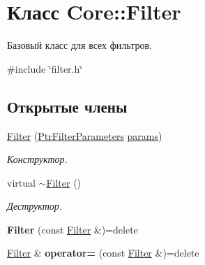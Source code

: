 \hypertarget{class_core_1_1_filter}{}\section{Класс Core\+:\+:Filter}
\label{class_core_1_1_filter}


Базовый класс для всех фильтров.  




{\ttfamily \#include \char`\"{}filter.\+h\char`\"{}}

\subsection*{Открытые члены}
\begin{DoxyCompactItemize}
\item 
\hyperlink{class_core_1_1_filter_af1ac0dfc8813579e0173b315c5a3fcad}{Filter} (\hyperlink{namespace_core_a4811af8148ba137d644b9a61a042cf03}{Ptr\+Filter\+Parameters} \hyperlink{class_core_1_1_filter_a44aa749b49ba46256975ce545531ecf7}{params})\hypertarget{class_core_1_1_filter_af1ac0dfc8813579e0173b315c5a3fcad}{}\label{class_core_1_1_filter_af1ac0dfc8813579e0173b315c5a3fcad}

\begin{DoxyCompactList}\small\item\em Конструктор. \end{DoxyCompactList}\item 
virtual \hyperlink{class_core_1_1_filter_a38353602e4df00367d49263dc6368268}{$\sim$\+Filter} ()\hypertarget{class_core_1_1_filter_a38353602e4df00367d49263dc6368268}{}\label{class_core_1_1_filter_a38353602e4df00367d49263dc6368268}

\begin{DoxyCompactList}\small\item\em Деструктор. \end{DoxyCompactList}\item 
{\bfseries Filter} (const \hyperlink{class_core_1_1_filter}{Filter} \&)=delete\hypertarget{class_core_1_1_filter_a76a8aef5adae9aa13ffb96e2b2398b4f}{}\label{class_core_1_1_filter_a76a8aef5adae9aa13ffb96e2b2398b4f}

\item 
\hyperlink{class_core_1_1_filter}{Filter} \& {\bfseries operator=} (const \hyperlink{class_core_1_1_filter}{Filter} \&)=delete\hypertarget{class_core_1_1_filter_a7e05e62d95d655d1e23e4a8485baedb7}{}\label{class_core_1_1_filter_a7e05e62d95d655d1e23e4a8485baedb7}


\end{DoxyCompactItemize}
